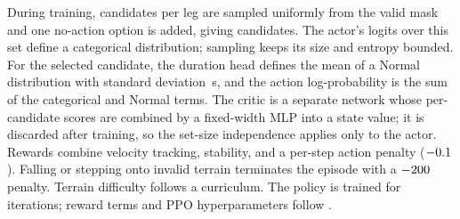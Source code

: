 During training, \numberstringnum{\corlTrainCandidatesPerLeg}
candidates per leg are sampled uniformly from the valid mask and one
no-action option is added, giving \corlTrainTotalCandidates{}
candidates. The actor's logits over this set define a categorical
distribution; sampling keeps its size and entropy bounded. For the
selected candidate, the duration head defines the mean of a Normal
distribution with standard deviation \corlDurationExploreStd\,s, and
the action log-probability is the sum of the categorical and Normal
terms. The critic is a separate network whose per-candidate scores are
combined by a fixed-width MLP into a state value; it is discarded after
training, so the set-size independence applies only to the actor.
Rewards combine velocity tracking, stability, and a per-step action
penalty ($-0.1$). Falling or stepping onto invalid terrain
terminates the episode with a $-200$ penalty.
Terrain difficulty follows a curriculum. The policy is trained for
\corlTrainingIterations{} iterations; reward terms and PPO
hyperparameters follow \cite{Sullivan2025}.
